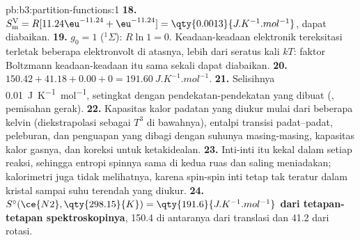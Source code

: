 \begin{solution}{pb:b3:partition-functions:1}
\textbf{18.} $S^{\mathrm V}_{\mathrm m} = R[11.24\eu^{-11.24} + \eu^{-11.24}] = \qty{0.0013}{J.K^{-1}.mol^{-1}}$,
dapat diabaikan.
\textbf{19.} $g_0 = 1$ (${}^1\Sigma$): $R\ln1 = 0$. Keadaan-keadaan elektronik
tereksitasi terletak beberapa elektronvolt di atasnya, lebih dari seratus
kali $kT$: faktor Boltzmann keadaan-keadaan itu sama sekali dapat diabaikan.
\textbf{20.} $150.42 + 41.18 + 0.00 + 0 = \qty{191.60}{J.K^{-1}.mol^{-1}}$.
\textbf{21.} Selisihnya \qty{0.01}{J.K^{-1}.mol^{-1}}, setingkat dengan
pendekatan-pendekatan yang dibuat (, pemisahan gerak).
\textbf{22.} Kapasitas kalor padatan yang diukur mulai dari beberapa kelvin
(diekstrapolasi sebagai $T^3$ di bawahnya), entalpi transisi padat--padat,
peleburan, dan penguapan yang dibagi dengan suhunya masing-masing, kapasitas
kalor gasnya, dan koreksi untuk ketakidealan.
\textbf{23.} Inti-inti itu kekal dalam setiap reaksi, sehingga entropi spinnya
sama di kedua ruas dan saling meniadakan; kalorimetri juga tidak melihatnya,
karena spin-spin inti tetap tak teratur dalam kristal sampai suhu terendah
yang diukur.
\textbf{24.} \textbf{$S^\circ(\ce{N2}, \qty{298.15}{K}) = \qty{191.6}{J.K^{-1}.mol^{-1}}$ dari
tetapan-tetapan spektroskopinya}, 150.4 di antaranya dari translasi dan 41.2
dari rotasi.
\end{solution}
